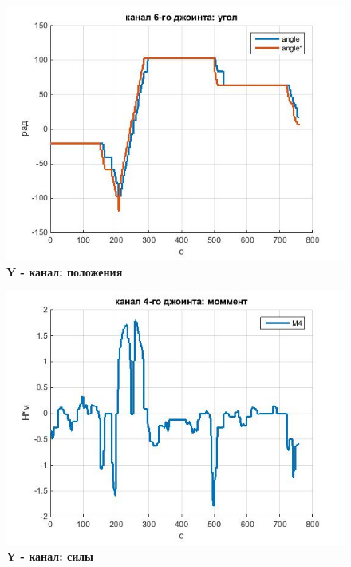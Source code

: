 \documentclass[a4paper,14pt,russian]{extreport} \usepackage{extsizes}
\begin{document}
	\begin{figure}[h]
		\centering		 
		\includegraphics[width=5.5in]{./graph/j6.jpg}	
		\caption{
			\textbf{Y - канал: положения}
		}
		\label{fig_img53}
	\end{figure}
	\begin{figure}[h]
		\centering		 
		\includegraphics[width=5.5in]{./graph/m4.jpg}	
		\caption{
			\textbf{Y - канал: силы}
		}
		\label{fig_img54}
	\end{figure}
\end{document}
